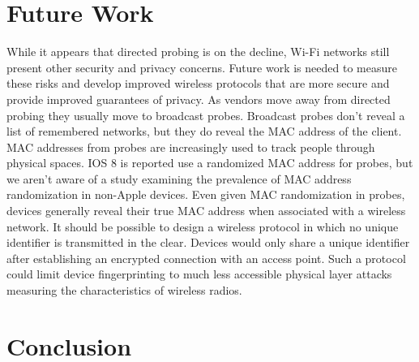 \documentclass[letterpaper,twocolumn,10pt]{article}
\begin{document}
\section{Future Work}
While it appears that directed probing is on the decline, Wi-Fi networks still present other security and privacy concerns. Future work is needed to measure these risks and develop improved wireless protocols that are more secure and provide improved guarantees of privacy. As vendors move away from directed probing they usually move to broadcast probes. Broadcast probes don't reveal a list of remembered networks, but they do reveal the MAC address of the client. MAC addresses from probes are increasingly used to track people through physical spaces. IOS 8 is reported use a randomized MAC address for probes, but we aren't aware of a study examining the prevalence of MAC address randomization in non-Apple devices. Even given MAC randomization in probes, devices generally reveal their true MAC address when associated with a wireless network. It should be possible to design a wireless protocol in which no unique identifier is transmitted in the clear. Devices would only share a unique identifier after establishing an encrypted connection with an access point. Such a protocol could limit device fingerprinting to much less accessible physical layer attacks measuring the characteristics of wireless radios.

\section{Conclusion}





\end{document}

